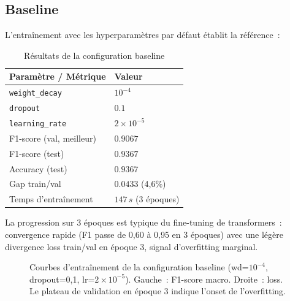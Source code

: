 \documentclass[12pt,a4paper]{article}
\begin{document}
\subsection{Baseline}
\label{ssec:baseline}

L'entraînement avec les hyperparamètres par défaut établit la référence~:

\begin{table}[H]
  \centering
  \caption{Résultats de la configuration baseline}
  \label{tab:baseline}
  \begin{tabular}{ll}
    \toprule
    \textbf{Paramètre / Métrique} & \textbf{Valeur} \\
    \midrule
    \texttt{weight\_decay}  & $10^{-4}$ \\
    \texttt{dropout}        & $0.1$ \\
    \texttt{learning\_rate} & $2 \times 10^{-5}$ \\
    \midrule
    F1-score (val, meilleur)   & $0.9067$ \\
    F1-score (test)            & $0.9367$ \\
    Accuracy (test)            & $0.9367$ \\
    Gap train/val              & $0.0433$ (4,6\%) \\
    Temps d'entraînement       & $147\,s$ (3 époques) \\
    \bottomrule
  \end{tabular}
\end{table}

La progression sur 3 époques est typique du fine-tuning de transformers~: convergence
rapide (F1 passe de 0,60 à 0,95 en 3 époques) avec une légère divergence loss
train/val en époque 3, signal d'overfitting marginal.

\begin{figure}[H]
  \centering
  \caption{Courbes d'entraînement de la configuration baseline (wd=$10^{-4}$,
    dropout=0,1, lr=$2\times10^{-5}$). Gauche~: F1-score macro. Droite~: loss.
    Le plateau de validation en époque 3 indique l'onset de l'overfitting.}
  \label{fig:baseline_curves}
\end{figure}
\end{document}

